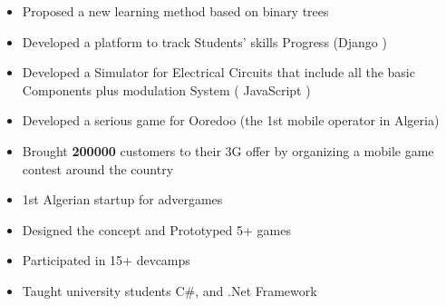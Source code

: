 \documentclass[10pt,a4paper,ragged2e,withhyper]{altacv}
\begin{document}
\begin{paracol}{2}
  \divider
  \begin{itemize}
    \item Proposed a new learning method based on binary trees
    \item Developed a platform to track Students' skills Progress (Django )
    \item Developed a Simulator for Electrical Circuits that include all the basic Components plus modulation System ( JavaScript )
  \end{itemize}
  \divider

  \begin{itemize}
    \item Developed a serious game for Ooredoo (the 1st mobile operator in Algeria)
    \item Brought \textbf{200000} customers to their 3G offer by organizing a mobile game contest around the country
  \end{itemize}

  \medskip

  \begin{itemize}
    \item 1st Algerian startup for advergames
    \item Designed the concept and Prototyped 5+ games
  \end{itemize}


  \divider

  \begin{itemize}
    \item Participated in 15+ devcamps
    \item Taught university students C\#, and .Net Framework
  \end{itemize}


\end{paracol}
\end{document}
